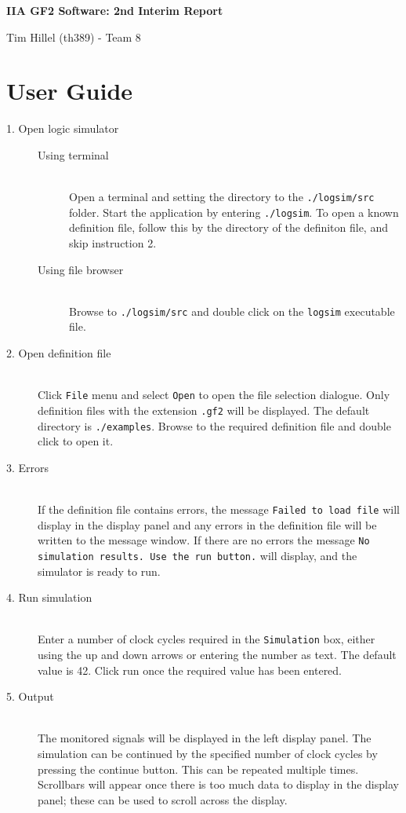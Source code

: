 \documentclass[a4paper,10pt]{article}
\begin{document}
\begin{center}
\LARGE \textbf{IIA GF2 Software: 2nd Interim Report}

\small Tim Hillel (th389) - Team 8
\end{center}

\section{User Guide}
\begin{description}
\item[1. Open logic simulator] \hspace{0.1em}
\begin{description}
 \item[Using terminal]\hfill \\
Open a terminal and setting the directory to the \texttt{./logsim/src} folder. Start the application by entering \texttt{./logsim}. To open a known definition file, follow this by the directory of the definiton file, and skip instruction 2.
 \item[Using file browser]\hfill \\ 
Browse to \texttt{./logsim/src} and double click on the \texttt{logsim} executable file.
\end{description}
\item[2. Open definition file]\hfill \\ 
Click \texttt{File} menu and select \texttt{Open} to open the file selection dialogue. Only definition files with the extension \texttt{.gf2} will be displayed. The default directory is \texttt{./examples}. Browse to the required definition file and double click to open it.
\item[3. Errors]\hfill \\
If the definition file contains errors, the message \texttt{Failed to load file} will display in the display panel and any errors in the definition file will be written to the message window. If there are no errors the message \texttt{No simulation results. Use the run button.} will display, and the simulator is ready to run.
\item[4. Run simulation]\hfill \\
Enter a number of clock cycles required in the \texttt{Simulation} box, either using the up and down arrows or entering the number as text. The default value is 42. Click run once the required value has been entered.
\item [5. Output]\hfill \\
The monitored signals will be displayed in the left display panel. The simulation can be continued by the specified number of clock cycles by pressing the continue button. This can be repeated multiple times. Scrollbars will appear once there is too much data to display in the display panel; these can be used to scroll across the display.

\end{description}
\end{document}
